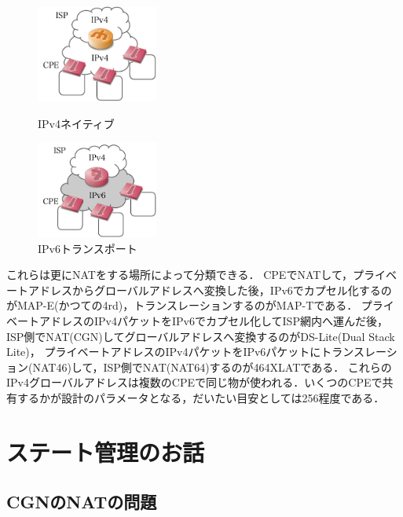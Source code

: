 \begin{figure}[htbp]
 \begin{minipage}{0.5\hsize}
  \begin{center}
   \includegraphics[bb=0 0 175 140,width=40mm]{./yuyarin/cgn.pdf}
  \end{center}
  \caption{IPv4ネイティブ}
  \label{fig:one}
 \end{minipage}
 \begin{minipage}{0.5\hsize}
  \begin{center}
   \includegraphics[bb=0 0 175 140,width=40mm]{./yuyarin/v6transport.pdf}
  \end{center}
  \caption{IPv6トランスポート}
  \label{fig:two}
 \end{minipage}
\end{figure}

これらは更にNATをする場所によって分類できる．
CPEでNATして，プライベートアドレスからグローバルアドレスへ変換した後，IPv6でカプセル化するのがMAP-E(かつての4rd)，トランスレーションするのがMAP-Tである．
プライベートアドレスのIPv4パケットをIPv6でカプセル化してISP網内へ運んだ後，ISP側でNAT(CGN)してグローバルアドレスへ変換するのがDS-Lite(Dual Stack Lite)，
プライベートアドレスのIPv4パケットをIPv6パケットにトランスレーション(NAT46)して，ISP側でNAT(NAT64)するのが464XLATである．
これらのIPv4グローバルアドレスは複数のCPEで同じ物が使われる．いくつのCPEで共有するかが設計のパラメータとなる，だいたい目安としては256程度である．

\section{ステート管理のお話}

\subsection{CGNのNATの問題}


